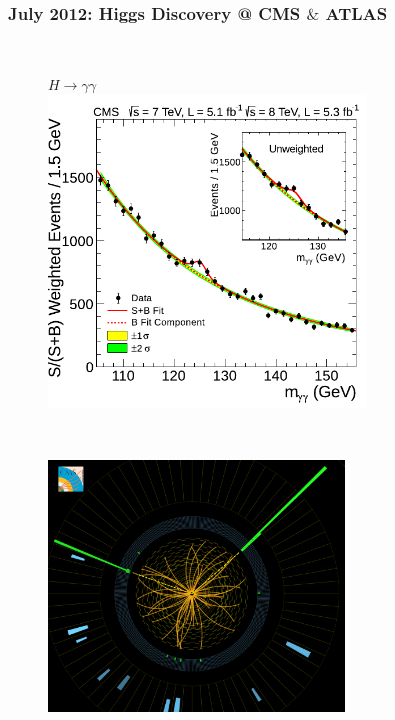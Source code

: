\documentclass[xcolor={usenames,dvipsnames,svgnames,table}]{beamer}
\begin{document}
\begin{frame}
    \frametitle{July 2012: Higgs Discovery @ CMS $\&$ ATLAS}
	\begin{columns}
    \begin{column}{0.49\textwidth}
        \begin{figure}[t]
			\\
			\vspace{-0.5cm}
			\centering \textcolor{color1}{$H \rightarrow \gamma\gamma$}\\
            \includegraphics[width=0.75\textwidth]{plots/higgsGG_discovery.pdf}
        \end{figure}\\
		\vspace{-0.9cm}
		\begin{figure}[t]
			\includegraphics[width=0.7\textwidth]{plots/cms_event_display.png}
        \end{figure}

\end{column}
\end{columns}
\end{frame}
\end{document}
